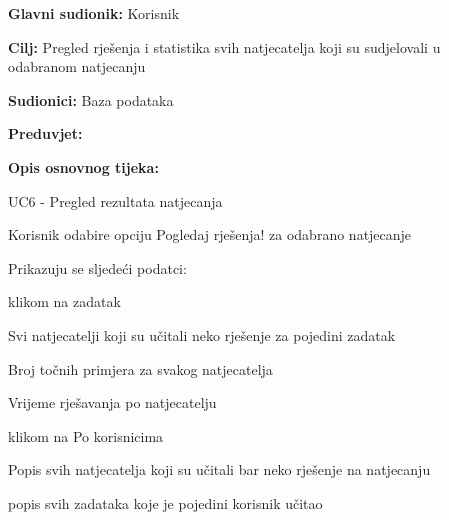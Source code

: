 					\noindent {}
					\begin{packed_item}
						
						\item \textbf{Glavni sudionik: }Korisnik
						\item  \textbf{Cilj:} Pregled rješenja i statistika svih natjecatelja koji su sudjelovali u odabranom natjecanju
						\item  \textbf{Sudionici:} Baza podataka
						\item  \textbf{Preduvjet:} 
						\item  \textbf{Opis osnovnog tijeka:}
						
						\item[] \begin{packed_enum}
							
							\item UC6 - Pregled rezultata natjecanja
							\item Korisnik odabire opciju Pogledaj rješenja! za odabrano natjecanje
							\item Prikazuju se sljedeći podatci:
							 \item[] \begin{packed_enum}
							 	\item klikom na zadatak
							 	 \item[] \begin{packed_enum}
							 	 	\item Svi natjecatelji koji su učitali neko rješenje za pojedini zadatak
							 	 	\item Broj točnih primjera za svakog natjecatelja
							 	 	\item Vrijeme rješavanja po natjecatelju
							 	 	\end{packed_enum}
							 	 \item klikom na Po korisnicima
							 	 \item[] \begin{packed_enum}
							 	 	\item Popis svih natjecatelja koji su učitali bar neko rješenje na natjecanju
							 	 	\item popis svih zadataka koje je pojedini korisnik učitao
							 	 \end{packed_enum}
							 \end{packed_enum}
						\end{packed_enum}
					\end{packed_item}


